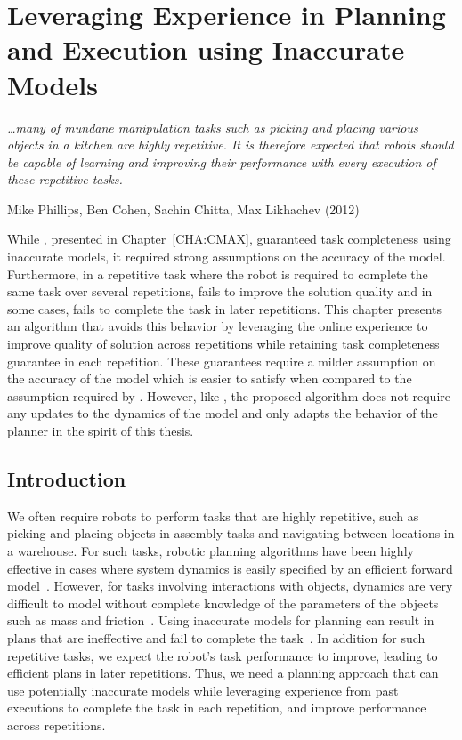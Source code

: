 \chapter{Leveraging Experience in Planning and Execution
  using Inaccurate Models}
\label{cha:lever-exper}

\epigraph{\textit{\ldots many of mundane manipulation tasks
such as picking and placing various objects in a kitchen are
highly repetitive. It is therefore expected that robots should
be capable of learning and improving their performance with
every execution of these repetitive tasks.}}{Mike Phillips, Ben Cohen,
Sachin Chitta, Max Likhachev (2012)}

While \cmax{}, presented in Chapter~\ref{CHA:CMAX}, guaranteed
task completeness using inaccurate models, it required strong
assumptions on the accuracy of the model. Furthermore, in a repetitive
task where the robot is required to complete the same task over
several repetitions, \cmax{} fails to improve the solution quality and
in some cases, fails to complete the task in later repetitions. This
chapter presents an algorithm that avoids this behavior by leveraging
the online experience to improve quality of solution across
repetitions while retaining task completeness guarantee in each
repetition. These guarantees require a milder assumption on the
accuracy of the model which is easier to satisfy when compared to the
assumption required by \cmax{}. However, like \cmax{}, the proposed
algorithm does not require any updates to the dynamics of the model
and only adapts the behavior of the planner in the spirit of this thesis.

\section{Introduction}
\label{sec:introduction}

We often require robots to perform tasks that are highly repetitive,
such as picking and placing objects in assembly tasks and navigating
between locations in a warehouse. For such tasks,
robotic planning algorithms have been highly effective in cases where
system dynamics is easily specified by an efficient forward
model~\cite{DBLP:conf/icra/BerensonAG12}. However, for
tasks involving interactions with objects, dynamics are very
difficult to model without
complete knowledge of the parameters of the
objects such as mass and friction~\cite{DBLP:journals/ijrr/JiX01}. 
Using
inaccurate models for planning can result in plans
that are ineffective and fail to complete the
task~\cite{DBLP:journals/ral/McConachiePMB20}. 
In addition for such
repetitive tasks, we expect the robot's task performance to
improve, leading to efficient plans in later repetitions.
Thus, we need
a planning approach that can use potentially inaccurate models while leveraging
experience from
past executions to complete the task in each repetition, and improve
performance across repetitions.


